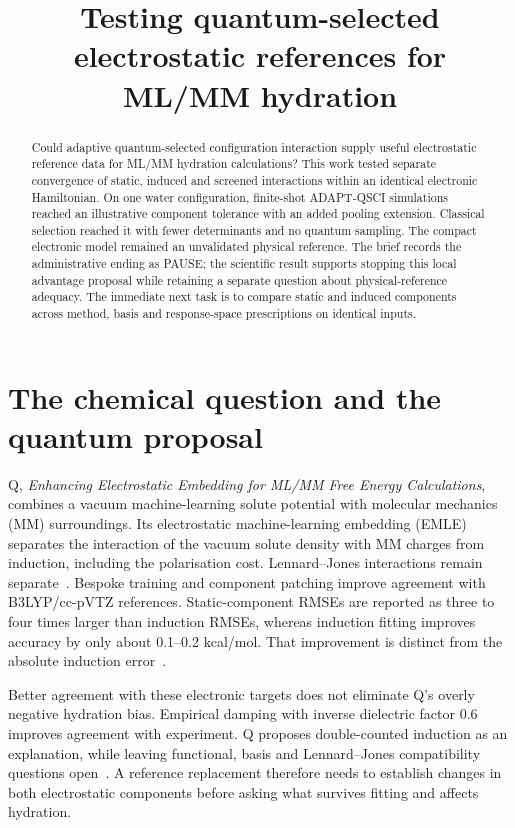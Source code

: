 \documentclass{article}
\title{Testing quantum-selected electrostatic references for ML/MM hydration}
\begin{document}
\maketitle

\begin{abstract}
Could adaptive quantum-selected configuration interaction supply useful electrostatic reference data for ML/MM hydration calculations? This work tested separate convergence of static, induced and screened interactions within an identical electronic Hamiltonian. On one water configuration, finite-shot ADAPT-QSCI simulations reached an illustrative component tolerance with an added pooling extension. Classical selection reached it with fewer determinants and no quantum sampling. The compact electronic model remained an unvalidated physical reference. The brief records the administrative ending as PAUSE; the scientific result supports stopping this local advantage proposal while retaining a separate question about physical-reference adequacy. The immediate next task is to compare static and induced components across method, basis and response-space prescriptions on identical inputs.
\end{abstract}

\section{The chemical question and the quantum proposal}
Q, \emph{Enhancing Electrostatic Embedding for ML/MM Free Energy Calculations}, combines a vacuum machine-learning solute potential with molecular mechanics (MM) surroundings. Its electrostatic machine-learning embedding (EMLE) separates the interaction of the vacuum solute density with MM charges from induction, including the polarisation cost. Lennard--Jones interactions remain separate~\cite{Q}. Bespoke training and component patching improve agreement with B3LYP/cc-pVTZ references. Static-component RMSEs are reported as three to four times larger than induction RMSEs, whereas induction fitting improves accuracy by only about 0.1--0.2 kcal/mol. That improvement is distinct from the absolute induction error~\cite{Q}.

Better agreement with these electronic targets does not eliminate Q's overly negative hydration bias. Empirical damping with inverse dielectric factor 0.6 improves agreement with experiment. Q proposes double-counted induction as an explanation, while leaving functional, basis and Lennard--Jones compatibility questions open~\cite{Q}. A reference replacement therefore needs to establish changes in both electrostatic components before asking what survives fitting and affects hydration.
\end{document}
